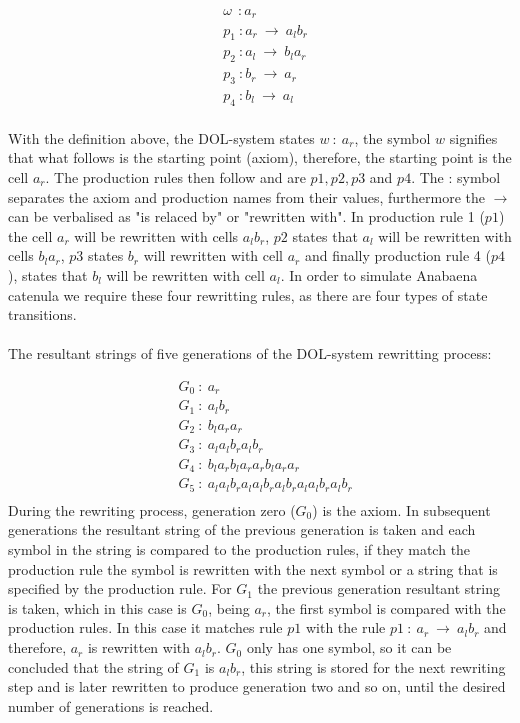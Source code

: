 \begin{equation} \label{DOL-system example}
\begin{aligned}
	&\omega~~ : a_r \\
	&p_1~ :  a_r~ \rightarrow~ a_l b_r\\
	&p_2~ :  a_l~ \rightarrow~ b_l a_r\\
	&p_3~ :  b_r~ \rightarrow~ a_r\\
	&p_4~ :  b_l~ \rightarrow~ a_l\\
\end{aligned}
\end{equation}

\noindent
With the definition above, the DOL-system states $w~ :~ a_r$, the symbol $w$ signifies that what follows is the starting point (axiom), therefore, the starting point is the cell $a_r$. The production rules then follow and are $p1, p2, p3$ and $p4$. The : symbol separates the axiom and production names from their values, furthermore the $\rightarrow$ can be verbalised as "is relaced by" or "rewritten with". In production rule 1 ($p1$) the cell $a_r$ will be rewritten with cells $a_l b_r$, $p2$ states that $a_l$ will be rewritten with cells $b_l a_r$, $p3$ states $b_r$ will rewritten with cell $a_r$ and finally production rule 4 ($p4$), states that $b_l$ will be rewritten with cell $a_l$. In order to simulate Anabaena catenula we require these four rewritting rules, as there are four types of state transitions. \\
\\
The resultant strings of five generations of the DOL-system rewritting process: 

\begin{equation} \label{DOL-system result string}
\begin{aligned}
	& G_0~ :~ a_r \\
	& G_1~ :~ a_l b_r \\
	& G_2~ :~ b_l a_r a_r \\
	& G_3~ :~ a_l a_l b_r a_l b_r \\
	& G_4~ :~ b_l a_r b_l a_r a_r b_l a_r a_r \\
	& G_5~ :~ a_l a_l b_r a_l a_l b_r a_l b_r a_l a_l b_r a_l b_r \\
\end{aligned}
\end{equation}
\noindent
During the rewriting process, generation zero ($G_0$) is the axiom. In subsequent generations the resultant string of the previous generation is taken and each symbol in the string is compared to the production rules, if they match the production rule the symbol is rewritten with the next symbol or a string that is specified by the production rule. For $G_1$ the previous generation resultant string is taken, which in this case is $G_0$, being $a_r$, the first symbol is compared with the production rules. In this case it matches rule $p1$ with the rule $p1~ :~ a_r~ \rightarrow~ a_l b_r$ and therefore, $a_r$ is rewritten with $a_l b_r$. $G_0$ only has one symbol, so it can be concluded that the string of $G_1$ is $a_l b_r$, this string is stored for the next rewriting step and is later rewritten to produce generation two and so on, until the desired number of generations is reached.

